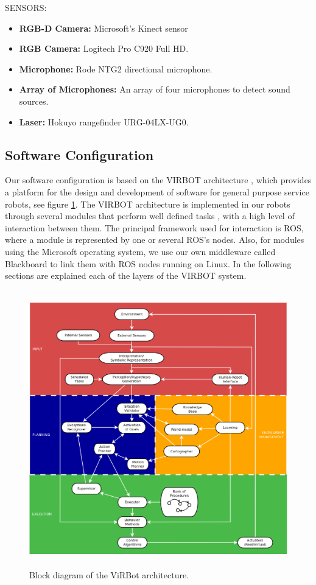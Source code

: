 \documentclass{llncs}
\begin{document}
SENSORS:

\begin{itemize}
	\item \textbf{RGB-D Camera:} Microsoft's Kinect sensor 
	\item \textbf{RGB Camera:} Logitech Pro C920 Full HD.
	\item \textbf{Microphone:} Rode NTG2 directional microphone.
	\item \textbf{Array of Microphones:} An array of four microphones to detect sound sources.
	\item \textbf{Laser:} Hokuyo rangefinder URG-04LX-UG0.
\end{itemize}

\subsection{Software Configuration}
Our software configuration is based on the VIRBOT architecture \cite{virbot}, 
which provides a platform for the design and development of software for general purpose service robots, see figure \ref{fig:virbot}. 
The VIRBOT architecture is implemented in our robots through several modules that perform well defined tasks \cite{muller}, with a 
high level of interaction between them. The principal framework used for interaction is ROS, where a module is represented by one or 
several ROS's nodes. Also, for modules using the Microsoft operating system, we use our own middleware called Blackboard to
link them with ROS nodes running on Linux.
In the following sections are explained each of the layers of the VIRBOT system.


\begin{figure}[h]
	\centering
	\includegraphics[angle=0, height=12cm, width=12cm]{Figures/ViRBot.eps}
	\caption{Block diagram of the ViRBot architecture.}
	\label{fig:virbot}
\end{figure}
\end{document}
